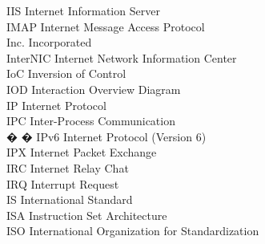 \begin{tabbing}
    \>IIS \>\>Internet Information Server\\


    \>IMAP \>\>Internet Message Access Protocol\\



    \>Inc. \>\>Incorporated\\

    \>InterNIC \>\>Internet Network Information Center\\

    \>IoC \>\>Inversion of Control\\

    \>IOD \>\>Interaction Overview Diagram\\


    \>IP \>\>Internet Protocol\\

    \>IPC \>\>Inter-Process Communication\\

� � \>IPv6 \>\>Internet Protocol (Version 6)\\

    \>IPX \>\>Internet Packet Exchange\\

    \>IRC \>\>Internet Relay Chat\\

    \>IRQ \>\>Interrupt Request\\

    \>IS \>\>International Standard\\

    \>ISA \>\>Instruction Set Architecture\\



    \>ISO \>\>International Organization for Standardization\\


\end{tabbing}
